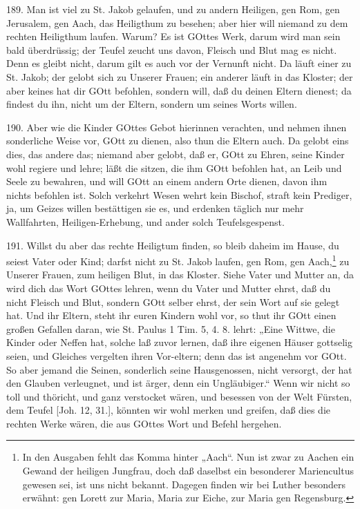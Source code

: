 189. Man ist viel zu St. Jakob gelaufen, und zu andern Heiligen, gen Rom, gen Jerusalem, gen Aach, das Heiligthum zu besehen; aber hier will niemand zu dem rechten Heiligthum laufen. Warum? Es ist GOttes Werk, darum wird man sein bald überdrüssig; der Teufel zeucht uns davon, Fleisch und Blut mag es nicht. Denn es gleibt nicht, darum gilt es auch vor
der Vernunft nicht. Da läuft einer zu St. Jakob; der gelobt sich zu Unserer Frauen; ein anderer läuft in das Kloster; der aber keines hat dir GOtt befohlen, sondern will, daß du deinen Eltern dienest; da findest du ihn, nicht um der Eltern, sondern um seines Worts willen.

190. Aber wie die Kinder GOttes Gebot hierinnen verachten, und nehmen ihnen sonderliche Weise vor, GOtt zu dienen, also thun die Eltern auch. Da gelobt eins dies, das andere das; niemand aber gelobt, daß er, GOtt zu Ehren, seine Kinder wohl regiere und lehre; läßt die sitzen, die ihm GOtt befohlen hat, an Leib und Seele zu bewahren, und will GOtt an einem andern Orte dienen, davon ihm nichts befohlen ist. Solch verkehrt Wesen wehrt kein Bischof, straft kein Prediger, ja, um Geizes willen bestättigen sie es, und erdenken täglich nur mehr Wallfahrten, Heiligen-Erhebung, und ander solch Teufelsgespenst.

191. Willst du aber das rechte Heiligtum finden, so bleib daheim im Hause, du seiest Vater oder Kind; darfst nicht zu St. Jakob laufen, gen Rom, gen Aach,\footnote{In den Ausgaben fehlt das Komma hinter „Aach“. Nun ist zwar zu Aachen ein Gewand der heiligen Jungfrau, doch daß daselbst ein besonderer Mariencultus gewesen sei, ist uns nicht bekannt. Dagegen finden wir bei Luther besonders erwähnt: gen Lorett zur Maria, Maria zur Eiche, zur Maria gen Regensburg.} zu Unserer Frauen, zum heiligen Blut, in das Kloster. Siehe Vater und Mutter an, da wird dich das Wort GOttes lehren, wenn du Vater und Mutter ehrst, daß du nicht Fleisch und Blut, sondern GOtt selber ehrst, der sein Wort auf sie gelegt hat. Und ihr Eltern, steht ihr euren Kindern wohl vor, so thut ihr GOtt einen großen Gefallen daran, wie St. Paulus 1 Tim. 5, 4. 8. lehrt: „Eine Wittwe, die Kinder oder Neffen hat, solche laß zuvor lernen, daß ihre eigenen Häuser gottselig seien, und Gleiches vergelten ihren Vor-eltern; denn das ist angenehm vor GOtt. So aber jemand die Seinen, sonderlich seine Hausgenossen, nicht versorgt, der hat den Glauben verleugnet, und ist ärger, denn ein Ungläubiger.“ Wenn wir nicht so toll und thöricht, und ganz verstocket wären, und besessen von der Welt Fürsten, dem Teufel [Joh. 12, 31.], könnten wir wohl merken und greifen, daß dies die rechten Werke wären, die aus GOttes Wort und Befehl hergehen.

